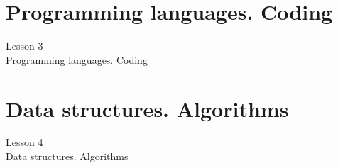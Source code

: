 \documentclass[aspectratio=1610]{beamer}
\begin{document}








\section{Programming languages. Coding}

\begin{frame}
\begin{center}
\Huge Lesson 3\\
Programming languages. Coding
\end{center}
\end{frame}




\section{Data structures. Algorithms}


\begin{frame}
\begin{center}
\Huge Lesson 4\\
Data structures. Algorithms
\end{center}
\end{frame}
\end{document}
